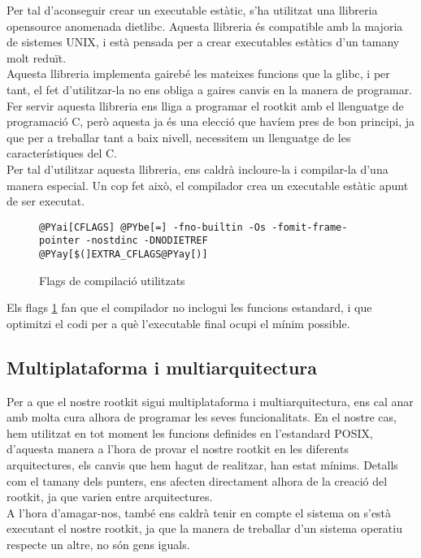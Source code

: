 Per tal d'aconseguir crear un executable estàtic, s'ha utilitzat una llibreria opensource anomenada dietlibc.
Aquesta llibreria és compatible amb la majoria de sistemes UNIX, i està pensada per a crear executables estàtics d'un tamany 
molt reduït. \\

Aquesta llibreria implementa gairebé les mateixes funcions que la glibc, i per tant, el fet d'utilitzar-la no ens obliga a gaires canvis en la manera de programar. Fer servir aquesta llibreria
ens lliga a programar el rootkit amb el llenguatge de programació C, però aquesta ja és una elecció que havíem pres de bon principi, ja que per a treballar tant a baix nivell,
necessitem un llenguatge de les característiques del C.\\

Per tal d'utilitzar aquesta llibreria, ens caldrà incloure-la i compilar-la d'una manera especial. Un cop fet això, el compilador crea un executable estàtic apunt de ser executat.
\begin{figure}[h!]
\begin{Verbatim}[commandchars=@\[\]]
@PYai[CFLAGS] @PYbe[=] -fno-builtin -Os -fomit-frame-pointer -nostdinc -DNODIETREF  @PYay[$(]EXTRA_CFLAGS@PYay[)] 
\end{Verbatim}
\caption{Flags de compilació utilitzats}
\label{fig:cflags}
\end{figure}

Els flags \ref{fig:cflags} fan que el compilador no inclogui les funcions estandard, i que optimitzi el codi 
per a què l'executable final ocupi el mínim possible.

\subsection{Multiplataforma i multiarquitectura}

Per a que el nostre rootkit sigui multiplataforma i multiarquitectura, ens cal anar amb molta cura alhora de programar les 
seves funcionalitats. En el nostre cas, hem utilitzat en tot moment les funcions definides en l'estandard POSIX, d'aquesta manera a l'hora de provar el nostre rootkit en les diferents arquitectures, els canvis que hem hagut de realitzar, han estat mínims. Detalls com el tamany dels punters, ens afecten directament alhora de la creació
del rootkit, ja que varien entre arquitectures. \\

A l'hora d'amagar-nos, també ens caldrà tenir en compte el sistema on s'està executant el nostre rootkit, ja que la manera de treballar
d'un sistema operatiu respecte un altre, no són gens iguals. \\


